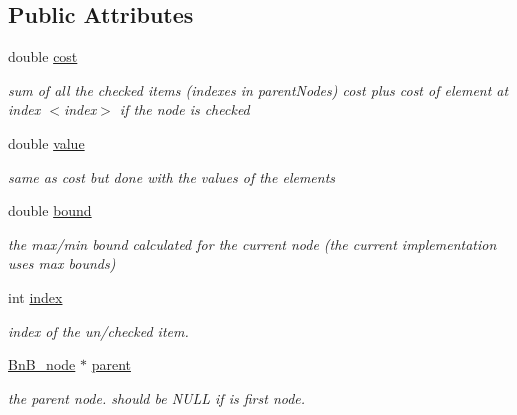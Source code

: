 \subsection*{Public Attributes}
\begin{DoxyCompactItemize}
\item 
\hypertarget{class_bn_b__node_a6a44afc83f3d0c1601804b61cf03fbf1}{}double \hyperlink{class_bn_b__node_a6a44afc83f3d0c1601804b61cf03fbf1}{cost}\label{class_bn_b__node_a6a44afc83f3d0c1601804b61cf03fbf1}

\begin{DoxyCompactList}\small\item\em sum of all the checked items (indexes in parent\+Nodes) cost plus cost of element at index $<$index$>$ if the node is checked \end{DoxyCompactList}\item 
\hypertarget{class_bn_b__node_a726b74bbceb33532ee8678e0722d62aa}{}double \hyperlink{class_bn_b__node_a726b74bbceb33532ee8678e0722d62aa}{value}\label{class_bn_b__node_a726b74bbceb33532ee8678e0722d62aa}

\begin{DoxyCompactList}\small\item\em same as cost but done with the values of the elements \end{DoxyCompactList}\item 
\hypertarget{class_bn_b__node_a275b8c6f02b922e74a7f82d8fb3b5cf9}{}double \hyperlink{class_bn_b__node_a275b8c6f02b922e74a7f82d8fb3b5cf9}{bound}\label{class_bn_b__node_a275b8c6f02b922e74a7f82d8fb3b5cf9}

\begin{DoxyCompactList}\small\item\em the max/min bound calculated for the current node (the current implementation uses max bounds) \end{DoxyCompactList}\item 
\hypertarget{class_bn_b__node_a531520424d5cc944a542a984cc14f32f}{}int \hyperlink{class_bn_b__node_a531520424d5cc944a542a984cc14f32f}{index}\label{class_bn_b__node_a531520424d5cc944a542a984cc14f32f}

\begin{DoxyCompactList}\small\item\em index of the un/checked item. \end{DoxyCompactList}\item 
\hypertarget{class_bn_b__node_ac70c63a5ed68adefb9bc9540ac8e68dd}{}\hyperlink{class_bn_b__node}{Bn\+B\+\_\+node} $\ast$ \hyperlink{class_bn_b__node_ac70c63a5ed68adefb9bc9540ac8e68dd}{parent}\label{class_bn_b__node_ac70c63a5ed68adefb9bc9540ac8e68dd}

\begin{DoxyCompactList}\small\item\em the parent node. should be N\+U\+L\+L if is first node. \end{DoxyCompactList}\end{DoxyCompactItemize}


